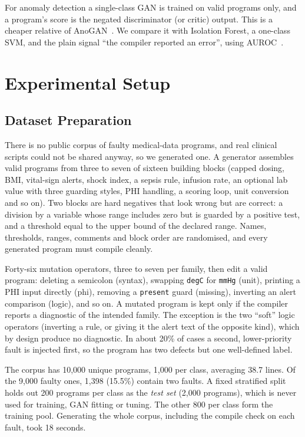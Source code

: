 \documentclass[12pt,a4paper]{article}
\newcommand{\code}[1]{\texttt{#1}}
\newcommand{\NProg}{10{,}000}
\newcommand{\NTest}{2{,}000}
\newcommand{\MeanLoc}{38.7}
\newcommand{\NDouble}{1{,}398}
\newcommand{\DoubleShare}{15.5}
\begin{document}
For anomaly detection a single-class GAN is trained on valid programs only, and a program's score is the negated
discriminator (or critic) output. This is a cheaper relative of AnoGAN~\cite{schlegl2017}. We compare it with Isolation
Forest, a one-class SVM, and the plain signal ``the compiler reported an error'', using AUROC~\cite{fawcett2006}.

\section{Experimental Setup}

\subsection{Dataset Preparation}

There is no public corpus of faulty medical-data programs, and real clinical scripts could not be shared anyway, so we
generated one. A generator assembles valid programs from three to seven of sixteen building blocks (capped dosing, BMI,
vital-sign alerts, shock index, a sepsis rule, infusion rate, an optional lab value with three guarding styles, PHI
handling, a scoring loop, unit conversion and so on). Two blocks are hard negatives that look wrong but are correct: a
division by a variable whose range includes zero but is guarded by a positive test, and a threshold equal to the upper
bound of the declared range. Names, thresholds, ranges, comments and block order are randomised, and every generated
program must compile cleanly.

Forty-six mutation operators, three to seven per family, then edit a valid program: deleting a semicolon (syntax),
swapping \code{degC} for \code{mmHg} (unit), printing a PHI input directly (phi), removing a \code{present} guard
(missing), inverting an alert comparison (logic), and so on. A mutated program is kept only if the compiler reports a
diagnostic of the intended family. The exception is the two ``soft'' logic operators (inverting a rule, or giving it the
alert text of the opposite kind), which by design produce no diagnostic. In about 20\% of cases a second, lower-priority
fault is injected first, so the program has two defects but one well-defined label.

The corpus has \NProg{} unique programs, 1{,}000 per class, averaging \MeanLoc{} lines. Of the 9{,}000 faulty ones,
\NDouble{} (\DoubleShare\%) contain two faults. A fixed stratified split holds out 200 programs per class as the
\emph{test set} (\NTest{} programs), which is never used for training, GAN fitting or tuning. The other 800 per class form
the training pool. Generating the whole corpus, including the compile check on each fault, took 18 seconds.
\end{document}
